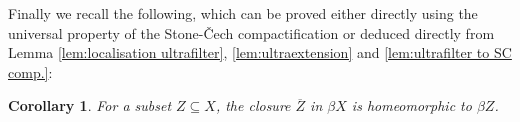\documentclass[12pt, a4paper]{amsart}
\numberwithin{equation}{section}
\newtheorem{cor}[thm]{Corollary}
\theoremstyle{definition}
\theoremstyle{remark}
\begin{document}
Finally we recall the following, which can be proved either directly using the universal property of the Stone-\v{C}ech compactification or deduced directly from Lemma \ref{lem:localisation ultrafilter}, \ref{lem:ultraextension} and \ref{lem:ultrafilter to SC comp.}:

\begin{cor}\label{cor:subspace in SC comp.}
For a subset $Z \subseteq X$, the closure $\overline{Z}$ in $\beta X$ is homeomorphic to $\beta Z$.
\end{cor}









\end{document}
